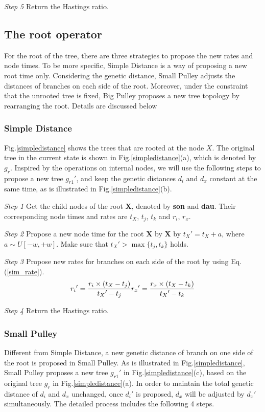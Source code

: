 \documentclass{bmcart}
\begin{document}
\emph{Step 5} Return the Hastings ratio.
\subsection*{The root operator}
For the root of the tree, there are three strategies to propose the new rates and node times. To be more specific, Simple Distance is a way of proposing a new root time only. Considering the genetic distance, Small Pulley adjusts the distances of branches on each side of the root. Moreover, under the constraint that the unrooted tree is fixed, Big Pulley proposes a new tree topology by rearranging the root.  Details are discussed below
\subsubsection*{Simple Distance}
Fig.\ref{simpledistance} shows the trees that are rooted at the node $X$. The original tree in the current state is shown in Fig.\ref{simpledistance}(a), which is denoted by $g_r$. Inspired by the operations on internal nodes, we will use the following steps to propose a new tree ${g_{r1}}'$, and keep the genetic distances $d_i$ and $d_x$ constant at the same time, as is illustrated in Fig.\ref{simpledistance}(b).

\emph{Step 1} Get the child nodes of the root \textbf{X}, denoted by \textbf{son} and \textbf{dau}. Their corresponding node times and rates are $t_X$, $t_j$, $t_k$ and $r_i$, $r_x$.

\emph{Step 2} Propose a new node time for the root \textbf{X} by \textbf{X} by ${t_X}' = {t_X} + a$, where $a \sim U[ - w, + w]$. Make sure that ${t_X}' > \max \{ {t_j},{t_k}\} $ holds.

\emph{Step 3} Propose new rates for branches on each side of the root by using Eq.(\ref{sim_rate}).
\begin{equation}
\label{sim_rate}
{r_i}' = \frac{{{r_i} \times ({{t_X} - {t_j}})}}{{{t_X}' - {t_j}}}\\
{r_x}' = \frac{{{r_x} \times ({{t_X} - {t_k}})}}{{{t_X}' - {t_k}}}
 \end{equation}

\emph{Step 4} Return the Hastings ratio.
\subsubsection*{Small Pulley}
Different from Simple Distance, a new genetic distance of branch on one side of the root is proposed in Small Pulley. As is illustrated in Fig.\ref{simpledistance}, Small Pulley proposes a new tree ${g_{r1}}'$ in Fig.\ref{simpledistance}(c), based on the original tree $g_r$ in Fig.\ref{simpledistance}(a). In order to maintain the total genetic distance of $d_i$ and $d_x$ unchanged, once ${d_i}'$ is proposed, $d_x$ will be adjusted by ${d_x}'$ simultaneously. The detailed process includes the following 4 steps.
\end{document}
